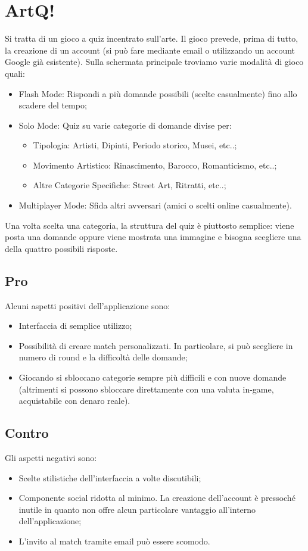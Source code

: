 \documentclass{article}
\begin{document}
\newpage

\section{ArtQ!}
Si tratta di un gioco a quiz incentrato sull’arte. Il gioco prevede, prima di tutto, la creazione di un account (si può fare mediante email o utilizzando un account Google già esistente). Sulla schermata principale troviamo varie modalità di gioco quali:
\begin{itemize}
\item Flash Mode: Rispondi a più domande possibili (scelte casualmente) fino allo scadere del tempo;
\item Solo Mode: Quiz su varie categorie di domande divise per:
\begin{itemize}
\item Tipologia: Artisti, Dipinti, Periodo storico, Musei, etc..;
\item Movimento Artistico: Rinascimento, Barocco, Romanticismo, etc..;
\item Altre Categorie Specifiche: Street Art, Ritratti, etc..;
\end{itemize}
\item Multiplayer Mode: Sfida altri avversari (amici o scelti online casualmente).
\end{itemize}
Una volta scelta una categoria, la struttura del quiz è piuttosto semplice: viene posta una domande oppure viene mostrata una immagine e bisogna scegliere una della quattro possibili risposte.

\subsection{Pro}
Alcuni aspetti positivi dell’applicazione sono:
\begin{itemize}
\item Interfaccia di semplice utilizzo;
\item Possibilità di creare match personalizzati. In particolare, si può scegliere in numero di round e la difficoltà delle domande;
\item Giocando si sbloccano categorie sempre più difficili e con nuove domande (altrimenti si possono sbloccare direttamente con una valuta in-game, acquistabile con denaro reale).
\end{itemize}

\subsection{Contro}
Gli aspetti negativi sono:
\begin{itemize}
\item Scelte stilistiche dell’interfaccia a volte discutibili;
\item Componente social ridotta al minimo. La creazione dell’account è pressoché inutile in quanto non offre alcun particolare vantaggio all’interno dell’applicazione;
\item L’invito al match tramite email può essere scomodo.
\end{itemize}
\end{document}
